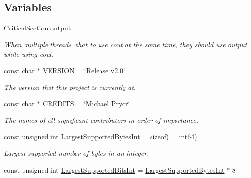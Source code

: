 \subsection*{Variables}
\begin{DoxyCompactItemize}
\item 
\hypertarget{namespace_utility_a1fe1f605ef9c02e43a339bfd1d2c8419}{
\hyperlink{class_critical_section}{CriticalSection} \hyperlink{namespace_utility_a1fe1f605ef9c02e43a339bfd1d2c8419}{output}}
\label{namespace_utility_a1fe1f605ef9c02e43a339bfd1d2c8419}

\begin{DoxyCompactList}\small\item\em When multiple threads what to use {\ttfamily cout} at the same time, they should use output while using {\ttfamily cout}. \item\end{DoxyCompactList}\item 
\hypertarget{namespace_utility_a9847ce4a21abef1de7dc04f4849f4384}{
const char $\ast$ \hyperlink{namespace_utility_a9847ce4a21abef1de7dc04f4849f4384}{VERSION} = \char`\"{}Release v2.0\char`\"{}}
\label{namespace_utility_a9847ce4a21abef1de7dc04f4849f4384}

\begin{DoxyCompactList}\small\item\em The version that this project is currently at. \item\end{DoxyCompactList}\item 
\hypertarget{namespace_utility_ab78d62aeb89cf5847943512d422454ec}{
const char $\ast$ \hyperlink{namespace_utility_ab78d62aeb89cf5847943512d422454ec}{CREDITS} = \char`\"{}Michael Pryor\char`\"{}}
\label{namespace_utility_ab78d62aeb89cf5847943512d422454ec}

\begin{DoxyCompactList}\small\item\em The names of all significant contributors in order of importance. \item\end{DoxyCompactList}\item 
\hypertarget{namespace_utility_a1a17222360aeac0c7e8b5a9b3b13cc58}{
const unsigned int \hyperlink{namespace_utility_a1a17222360aeac0c7e8b5a9b3b13cc58}{LargestSupportedBytesInt} = sizeof(\_\-\_\-int64)}
\label{namespace_utility_a1a17222360aeac0c7e8b5a9b3b13cc58}

\begin{DoxyCompactList}\small\item\em Largest supported number of bytes in an integer. \item\end{DoxyCompactList}\item 
\hypertarget{namespace_utility_aecfbcd7ef189efdf916f62b8b85b46f6}{
const unsigned int \hyperlink{namespace_utility_aecfbcd7ef189efdf916f62b8b85b46f6}{LargestSupportedBitsInt} = \hyperlink{namespace_utility_a1a17222360aeac0c7e8b5a9b3b13cc58}{LargestSupportedBytesInt} $\ast$ 8}
\label{namespace_utility_aecfbcd7ef189efdf916f62b8b85b46f6}


\end{DoxyCompactItemize}
